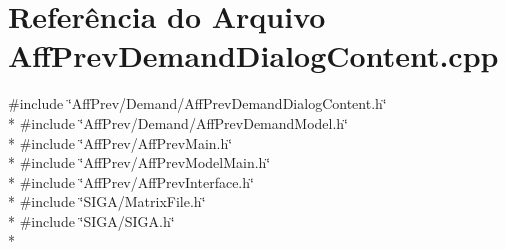 \section{Referência do Arquivo Aff\+Prev\+Demand\+Dialog\+Content.\+cpp}
\label{_aff_prev_demand_dialog_content_8cpp}
{\ttfamily \#include \char`\"{}Aff\+Prev/\+Demand/\+Aff\+Prev\+Demand\+Dialog\+Content.\+h\char`\"{}}\\*
{\ttfamily \#include \char`\"{}Aff\+Prev/\+Demand/\+Aff\+Prev\+Demand\+Model.\+h\char`\"{}}\\*
{\ttfamily \#include \char`\"{}Aff\+Prev/\+Aff\+Prev\+Main.\+h\char`\"{}}\\*
{\ttfamily \#include \char`\"{}Aff\+Prev/\+Aff\+Prev\+Model\+Main.\+h\char`\"{}}\\*
{\ttfamily \#include \char`\"{}Aff\+Prev/\+Aff\+Prev\+Interface.\+h\char`\"{}}\\*
{\ttfamily \#include \char`\"{}S\+I\+G\+A/\+Matrix\+File.\+h\char`\"{}}\\*
{\ttfamily \#include \char`\"{}S\+I\+G\+A/\+S\+I\+G\+A.\+h\char`\"{}}\\*
